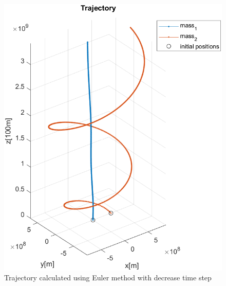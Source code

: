 \documentclass[english,12pt,a4paper, notitlepage]{report}
\begin{document}
	\begin{figure}[h!]
		\centering
		\includegraphics[height=0.3\textheight]{new_trj_euler.png}
		\caption{Trajectory calculated using Euler method with decrease time step}
		\label{fig:euler_4}
	\end{figure}
	
	
		
\end{document}
